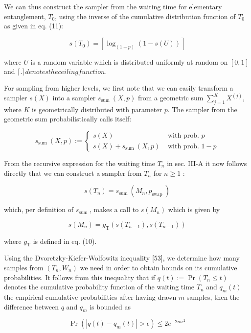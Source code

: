 \documentclass[10pt]{article}
\begin{document}
We can thus construct the sampler from the waiting time for elementary entanglement, $T_{0}$, using the inverse of the cumulative distribution function of $T_{0}$ as given in eq. (11):


\begin{equation*}
s\left(T_{0}\right)=\left\lceil\log _{(1-p)}(1-s(U))\right\rceil \tag{27}
\end{equation*}


where $U$ is a random variable which is distributed uniformly at random on $[0,1]$ and $\lceil$.$\rceil denotes the ceiling function.$

For sampling from higher levels, we first note that we can easily transform a sampler $s(X)$ into a sampler $s_{\text {sum }}(X, p)$ from a geometric sum $\sum_{j=1}^{K} X^{(j)}$, where $K$ is geometrically distributed with parameter $p$. The sampler from the geometric sum probabilistically calls itself:

$$
s_{\text {sum }}(X, p):= \begin{cases}s(X) & \text { with prob. } p \\ s(X)+s_{\text {sum }}(X, p) & \text { with prob. } 1-p\end{cases}
$$

From the recursive expression for the waiting time $T_{n}$ in sec. III-A it now follows directly that we can construct a sampler from $T_{n}$ for $n \geq 1$ :

$$
s\left(T_{n}\right)=s_{\text {sum }}\left(M_{n}, p_{\text {swap }}\right)
$$

which, per definition of $s_{\text {sum }}$, makes a call to $s\left(M_{n}\right)$ which is given by

$$
s\left(M_{n}\right)=g_{\mathrm{T}}\left(s\left(T_{n-1}\right), s\left(T_{n-1}\right)\right)
$$

where $g_{\mathrm{T}}$ is defined in eq. (10).

Using the Dvoretzky-Kiefer-Wolfowitz inequality [53], we determine how many samples from $\left(T_{n}, W_{n}\right)$ we need in order to obtain bounds on its cumulative probabilities. It follows from this inequality that if $q(t):=\operatorname{Pr}\left(T_{n} \leq t\right)$ denotes the cumulative probability function of the waiting time $T_{n}$ and $q_{m}(t)$ the empirical cumulative probabilities after having drawn $m$ samples, then the difference between $q$ and $q_{m}$ is bounded as

$$
\operatorname{Pr}\left(\left|q(t)-q_{m}(t)\right|>\epsilon\right) \leq 2 e^{-2 m \epsilon^{2}}
$$
\end{document}
